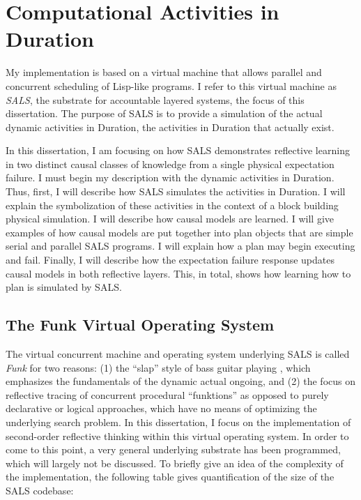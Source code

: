 \chapter{Computational Activities in Duration}
\label{chapter:computational_activities_in_duration}


My implementation is based on a virtual machine that allows parallel
and concurrent scheduling of Lisp-like programs.  I refer to this
virtual machine as \emph{SALS}, the substrate for accountable layered
systems, the focus of this dissertation.  The purpose of SALS is to
provide a simulation of the actual dynamic activities in Duration, the
activities in Duration that actually exist.

In this dissertation, I am focusing on how SALS demonstrates
reflective learning in two distinct causal classes of knowledge from a
single physical expectation failure.  I must begin my description with
the dynamic activities in Duration.  Thus, first, I will describe how
SALS simulates the activities in Duration.  I will explain the
symbolization of these activities in the context of a block building
physical simulation.  I will describe how causal models are learned.
I will give examples of how causal models are put together into plan
objects that are simple serial and parallel SALS programs.  I will
explain how a plan may begin executing and fail.  Finally, I will
describe how the expectation failure response updates causal models in
both reflective layers.  This, in total, shows how learning how to
plan is simulated by SALS.

\section{The Funk Virtual Operating System}

The virtual concurrent machine and operating system underlying SALS is
called \emph{Funk} \cite[]{morgan:2009} for two reasons: (1) the
``slap'' style of bass guitar playing \cite[]{graham:1969,
  johnson:1984}, which emphasizes the fundamentals of the dynamic
actual ongoing, and (2) the focus on reflective tracing of concurrent
procedural ``funktions'' as opposed to purely declarative or logical
approaches, which have no means of optimizing the underlying search
problem.  In this dissertation, I focus on the implementation of
second-order reflective thinking within this virtual operating system.
In order to come to this point, a very general underlying substrate
has been programmed, which will largely not be discussed.  To briefly
give an idea of the complexity of the implementation, the following
table gives quantification of the size of the SALS codebase:

